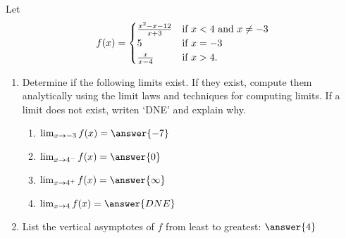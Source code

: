 \documentclass{ximera}
\begin{document}
\begin{exercise}


Let 
\[
f(x)=\begin{cases}
\frac{x^2-x-12}{x+3} & \text{if $x<4$ and $x\ne -3$}\\
5 & \text{if $x=-3$}\\
\frac{x}{x-4} & \text{if $x>4$}\ldotp
\end{cases}
\]
\begin{enumerate}[label=\bf{(\Roman*)},align=left]
\item Determine if the following limits exist. If they exist, compute them analytically using the limit laws and techniques for computing limits. If a limit does not exist, writen `DNE' and explain why. 

\begin{enumerate}[label=\bf{(\alph*)}]
\item $\lim_{x\to -3}f(x)=\answer{-7}$
\item $\lim_{x\to 4^{-}}f(x)=\answer{0}$
\item $\lim_{x\to 4^+}f(x)=\answer{\infty}$ %
\item $\lim_{x\to 4}f(x)=\answer{DNE}$
\end{enumerate}
\item List the vertical asymptotes of $f$ from least to greatest: $\answer{4}$
\end{enumerate}

\end{exercise}
\end{document}
